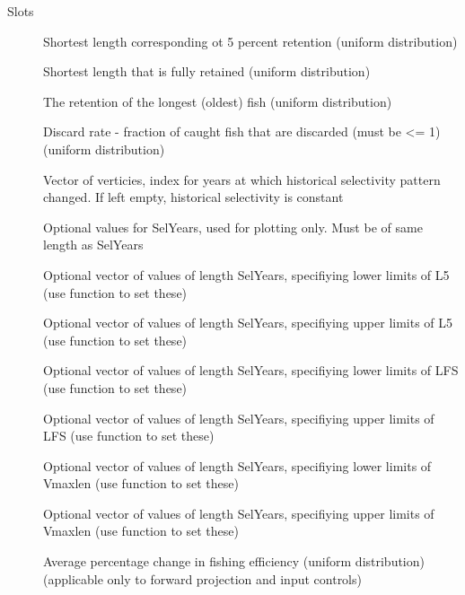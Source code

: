 \documentclass[a4paper]{book}
\begin{document}
\begin{Section}{Slots}
\begin{description}
\item[] Shortest length corresponding ot 5 percent retention (uniform distribution)

\item[] Shortest length that is fully retained (uniform distribution)

\item[] The retention of the longest (oldest) fish (uniform distribution)

\item[] Discard rate - fraction of caught fish that are discarded (must be <= 1) (uniform distribution)

\item[] Vector of verticies, index for years at which historical selectivity pattern changed. If left empty, historical selectivity is constant

\item[] Optional values for SelYears, used for plotting only. Must be of same length as SelYears

\item[] Optional vector of values of length SelYears, specifiying lower limits of L5 (use  function to set these)

\item[] Optional vector of values of length SelYears, specifiying upper limits of L5 (use  function to set these)

\item[] Optional vector of values of length SelYears, specifiying lower limits of LFS (use  function to set these)

\item[] Optional vector of values of length SelYears, specifiying upper limits of LFS (use  function to set these)

\item[] Optional vector of values of length SelYears, specifiying lower limits of Vmaxlen (use  function to set these)

\item[] Optional vector of values of length SelYears, specifiying upper limits of Vmaxlen (use  function to set these)

\item[] Average percentage change in fishing efficiency (uniform distribution)(applicable only to forward projection and input controls)


\end{description}
\end{Section}
\end{document}
